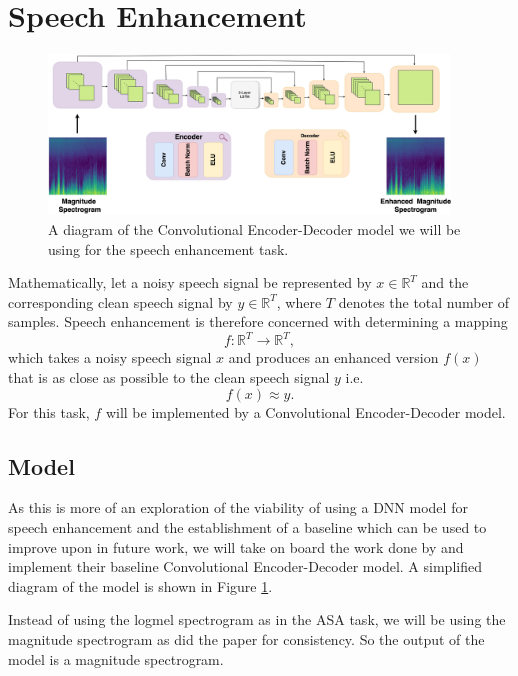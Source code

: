 \documentclass[logo,bsc,singlespacing,parskip,online]{infthesis}
\begin{document}
\section{Speech Enhancement}
\label{sec:methodology-se}
\begin{figure}[h]
   \centering
   \includegraphics[width=0.95\textwidth]{se-model-diagram-2.png}
   \caption{A diagram of the Convolutional Encoder-Decoder model we will be using for the speech enhancement task.}
   \label{fig:speech-enhancement-model-architecture}
\end{figure}
Mathematically, let a noisy speech signal be represented by \(x \in \mathbb{R}^{T}\) and the corresponding clean speech signal by \(y \in \mathbb{R}^{T}\), where \(T\) denotes the total number of samples.
Speech enhancement is therefore concerned with determining a mapping 
\[
f: \mathbb{R}^{T} \to \mathbb{R}^{T},
\]
which takes a noisy speech signal \(x\) and produces an enhanced version \(f(x)\) that is as close as possible to the clean speech signal \(y\) i.e.
\[
f(x) \approx y.
\]
For this task, $f$ will be implemented by a Convolutional Encoder-Decoder model.
\subsection{Model}
\label{sec:se-model}
As this is more of an exploration of the viability of using a DNN model for speech enhancement 
and the establishment of a baseline which can be used to improve upon in future work, 
we will take on board the work done by \citet{tan18_interspeech} and implement their baseline Convolutional Encoder-Decoder model.
A simplified diagram of the model is shown in Figure \ref{fig:speech-enhancement-model-architecture}.

Instead of using the logmel spectrogram as in the ASA task, we will be using the magnitude spectrogram 
as did the paper for consistency. So the output of the model is a magnitude spectrogram. 
\end{document}
